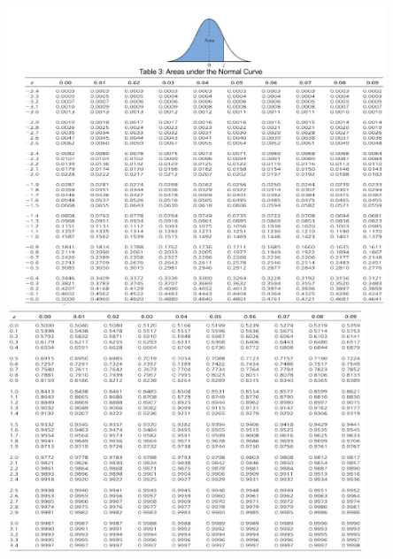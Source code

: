 \documentclass{package/notes}
\begin{document}
\begin{center}
	\includegraphics[width=0.85\textwidth]{appendix_images/Table3_1.PNG}
	\includegraphics[width=0.80\textwidth]{appendix_images/Table3_2.PNG}
\end{center}
\end{document}
